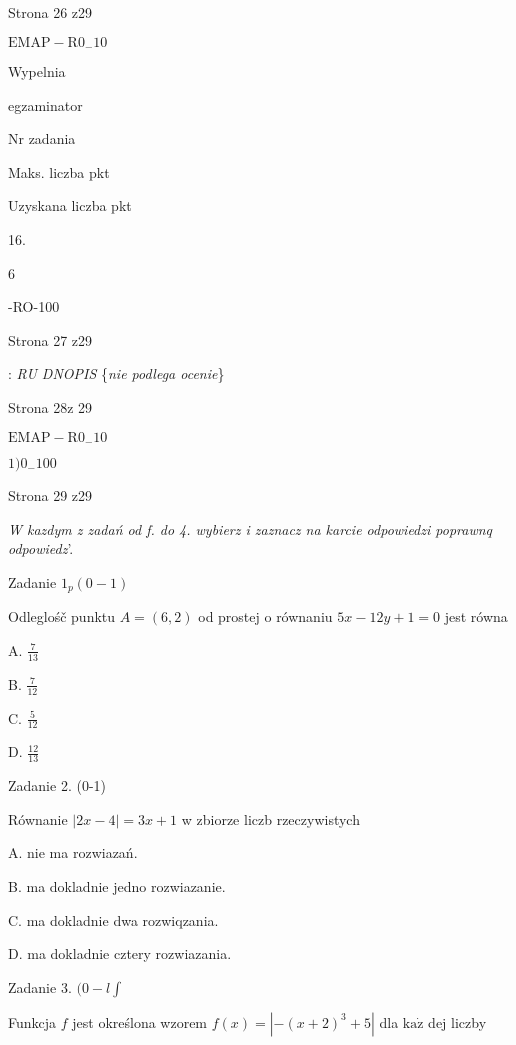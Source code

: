 \documentclass[a4paper,12pt]{article}
\begin{document}
Strona 26 z29

$\mathrm{E}\mathrm{M}\mathrm{A}\mathrm{P}-\mathrm{R}0_{-}10$





Wypelnia

egzaminator

Nr zadania

Maks. liczba pkt

Uzyskana liczba pkt

16.

6

-RO-100

Strona 27 z29





: {\it RU DNOPIS} \{{\it nie podlega ocenie}\}

Strona 28z 29

$\mathrm{E}\mathrm{M}\mathrm{A}\mathrm{P}-\mathrm{R}0_{-}10$





$1)0_{-}100$

Strona 29 z29










{\it W kazdym z zadań od f. do 4. wybierz i zaznacz na karcie odpowiedzi poprawnq odpowiedz}'.

Zadanie $1_{p}(0-1)$

Odleglośč punktu $A=(6,2)$ od prostej o równaniu $5x-12y+1=0$ jest równa

A. $\displaystyle \frac{7}{13}$

B. $\displaystyle \frac{7}{12}$

C. $\displaystyle \frac{5}{12}$

D. $\displaystyle \frac{12}{13}$

Zadanie 2. (0-1)

Równanie $|2x-4|=3x+1$ w zbiorze liczb rzeczywistych

A. nie ma rozwiazań.

B. ma dokladnie jedno rozwiazanie.

C. ma dokladnie dwa rozwiqzania.

D. ma dokladnie cztery rozwiazania.

Zadanie 3. $(0-l\displaystyle \int$

Funkcja $f$ jest określona wzorem $f(x)=|-(x+2)^{3}+5|$ dla $\mathrm{k}\mathrm{a}\dot{\mathrm{z}}$ dej liczby
\end{document}
